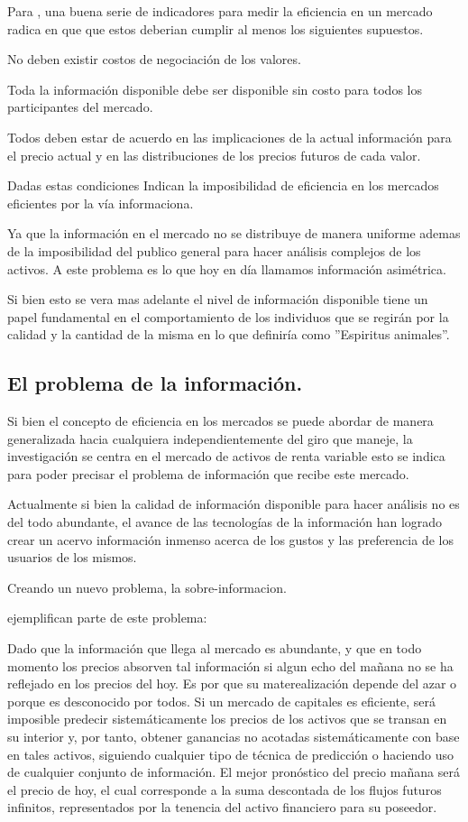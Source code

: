 \documentclass[letterpaper,12pt,oneside]{book}
\begin{document}
Para \cite{a10}, una buena serie de indicadores para medir la eficiencia en un mercado radica en que que estos deberian cumplir al menos los siguientes supuestos.

No deben existir costos de negociación de los valores.

Toda la información disponible debe ser disponible sin costo para todos los participantes del mercado.

Todos deben estar de acuerdo en las implicaciones de la actual información para el precio actual y en las distribuciones de los precios futuros de cada valor.


Dadas estas condiciones \cite{a6} Indican la imposibilidad de eficiencia en los mercados eficientes por la vía informaciona.

Ya que la información en el mercado no se distribuye de manera uniforme ademas de la imposibilidad del publico general para hacer análisis complejos de los activos. A este problema es lo que hoy en día llamamos información asimétrica.

Si bien esto se vera mas adelante el nivel de información disponible tiene un papel fundamental en el comportamiento de los individuos que se regirán por la calidad y la cantidad de la misma en lo que \cite{a11} definiría como ''Espiritus animales''.



\subsection{El problema de la información.}

Si bien el concepto de eficiencia en los mercados se puede abordar de manera generalizada hacia cualquiera independientemente del giro que maneje, la investigación se centra en el mercado de activos de renta variable esto se indica para poder precisar el problema de información que recibe este mercado.

Actualmente si bien la calidad de información disponible para hacer análisis no es del todo abundante, el avance de las tecnologías de la información han logrado crear un acervo información inmenso acerca de los gustos y las preferencia de los usuarios de los mismos.

Creando un nuevo problema, la sobre-informacion.

\cite{b1} ejemplifican parte de este problema:


Dado que la información que llega al mercado es abundante, y que en todo momento los precios absorven tal información si algun echo del mañana no se ha reflejado en los precios del hoy. Es por que su materealización depende del azar o porque es desconocido por todos. Si un mercado de capitales es eficiente, será imposible predecir sistemáticamente los precios de los activos que se transan en su interior y, por tanto, obtener ganancias no acotadas sistemáticamente con base en tales activos, siguiendo cualquier tipo de técnica de predicción o haciendo uso de cualquier conjunto de información. El mejor pronóstico del precio mañana será el precio de hoy, el cual corresponde a la suma descontada de los flujos futuros infinitos, representados por la tenencia del activo financiero para su poseedor.
\end{document}
